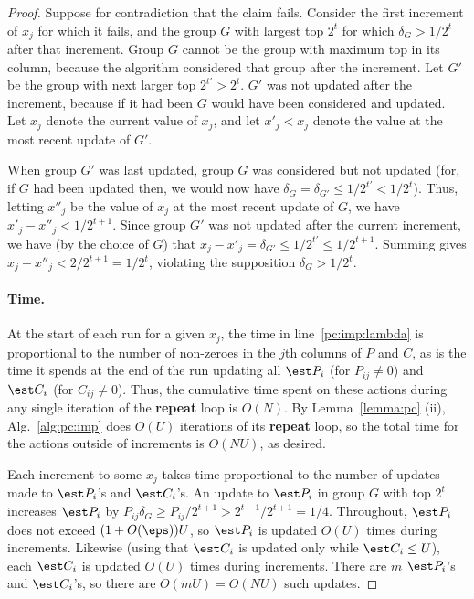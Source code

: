 \begin{proof}
  Suppose for contradiction that the claim fails.
  Consider the first increment of $x_j$ for which it fails,
  and the group $G$ with largest top $2^t$ for which $\delta_G > 1/2^t$ 
  after that increment.
  Group $G$ cannot be the group with maximum top in its column,
  because the algorithm considered that group after the increment.
  Let $G'$ be the group with next larger top $2^{t'} > 2^t$.
  $G'$ was not updated after the increment,
  because if it had been $G$ would have been considered and updated.
  Let $x_j$ denote the current value of $x_j$,
  and let $x'_j < x_j$ denote the value at the most recent update of $G'$.

  When group $G'$ was last updated, group $G$ was considered but not updated
  (for, if $G$ had been updated then,
  we would now have $\delta_G = \delta_{G'} \le 1/2^{t'} < 1/2^t$).
  Thus, letting $x''_j$ be the value of $x_j$ at the most recent update of $G$,
  we have $x'_j - x''_j < 1/2^{t+1}$.
  Since group $G'$ was not updated after the current increment,
  we have (by the choice of $G$) that $x_j - x'_j  = \delta_{G'} \le 1/2^{t'} \le 1/2^{t+1}$.
  Summing gives $x_j - x''_j < 2/2^{t+1} = 1/2^{t}$,
  violating the supposition $\delta_G > 1/2^t$.

  \paragraph{Time.}
  At the start of each run for a given $x_j$,
  the time in line~\ref{pc:imp:lambda}
  is proportional to the number of non-zeroes in the $j$th columns of $P$ and $C$,
  as is the time it spends at the end of the run updating 
  all $\est P_i$ (for $P_{ij} \ne 0$) and $\est C_i$ (for $C_{ij} \ne 0$).
  Thus, the cumulative time spent on these actions during any single
  iteration of the {\bf repeat} loop is $O(N)$.
  By Lemma~\ref{lemma:pc} (ii), Alg.~\ref{alg:pc:imp}
  does $O(U)$ iterations of its {\bf repeat} loop,
  so the total time for the actions outside of increments is $O(N U)$, as desired.

  Each increment to some $x_j$
  takes time proportional to the number
  of updates made to $\est P_i$'s and $\est C_i$'s.
  An update to $\est P_i$ in group $G$ with top $2^t$
  increases $\est P_i$ by $P_{ij} \delta_G \ge P_{ij}/2^{t+1} > 2^{t-1}/2^{t+1} = 1/4$.
  Throughout,
  $\est  P_i$ does not exceed $(1+O(\eps)) U$,
  so $\est P_i$ is updated $O(U)$ times during increments.
  Likewise (using that $\est C_i$ is updated only while $\est C_i \le U$),
  each $\est C_i$ is updated $O(U)$ times during increments.
  There are $m$ $\est P_i$'s and $\est C_i$'s,
  so there are $O(mU) = O(NU)$ such updates.
\end{proof}

